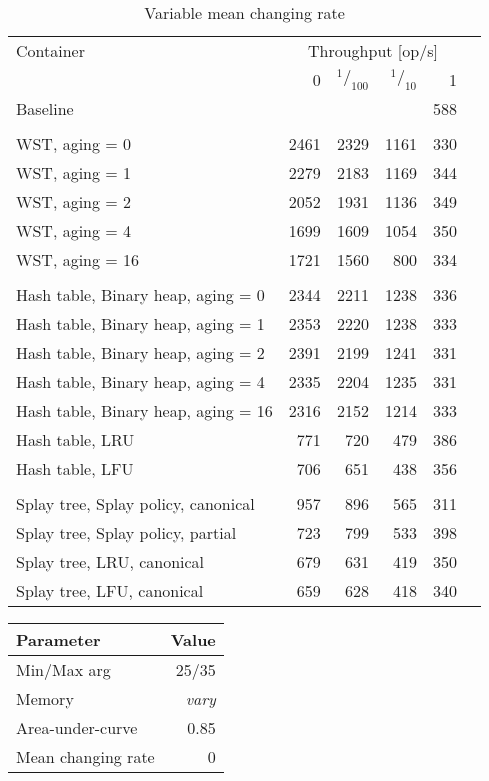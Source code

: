 \begin{table}
\caption{Variable mean changing rate}
\begin{tabular}[]{l r r r r r} \toprule
Container & \multicolumn{4}{c}{Throughput [op/s]} \\ \cmidrule(r){2-5}
& 0 & $^1/_{100}$ & $^1/_{10}$ & 1 \\ \midrule
Baseline & \multicolumn{4}{r}{588}  \\
\\
WST, aging = 0 & 2461 & 2329 & 1161 & 330 \\
WST, aging = 1 & 2279 & 2183 & 1169 & 344 \\
WST, aging = 2 & 2052 & 1931 & 1136 & 349 \\
WST, aging = 4 & 1699 & 1609 & 1054 & 350 \\
WST, aging = 16 & 1721 & 1560 & 800 & 334 \\
\\
Hash table, Binary heap, aging = 0 & 2344 & 2211 & 1238 & 336 \\
Hash table, Binary heap, aging = 1 & 2353 & 2220 & 1238 & 333 \\
Hash table, Binary heap, aging = 2 & 2391 & 2199 & 1241 & 331 \\
Hash table, Binary heap, aging = 4 & 2335 & 2204 & 1235 & 331 \\
Hash table, Binary heap, aging = 16 & 2316 & 2152 & 1214 & 333 \\
Hash table, LRU & 771 & 720 & 479 & 386 \\
Hash table, LFU & 706 & 651 & 438 & 356 \\
\\
Splay tree, Splay policy, canonical & 957 & 896 & 565 & 311 \\
Splay tree, Splay policy, partial & 723 & 799 & 533 & 398 \\
Splay tree, LRU, canonical & 679 & 631 & 419 & 350 \\
Splay tree, LFU, canonical & 659 & 628 & 418 & 340 \\
\bottomrule
\end{tabular}
\end{table}

\pagebreak

\begin{tabular}[h]{l r} \toprule
Parameter & Value \\ \midrule
Min/Max arg & 25/35 \\
Memory & \emph{vary} \\
Area-under-curve & 0.85 \\
Mean changing rate & 0 \\ \bottomrule
\end{tabular}

